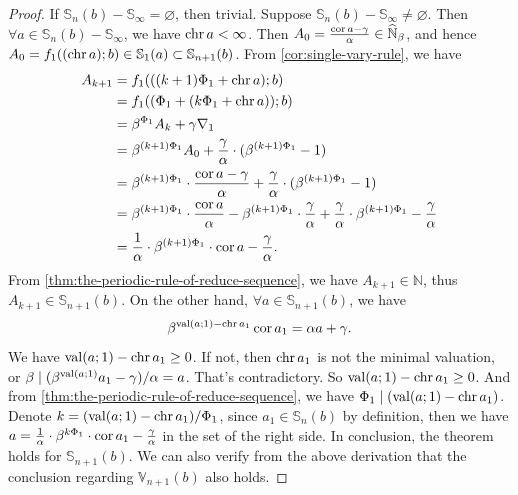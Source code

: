 \begin{proof}
    If $\mathbb{S}_{n}(b) - \mathbb{S}_{\infty} = \varnothing$, then trivial.\newline
    Suppose $\mathbb{S}_{n}(b) - \mathbb{S}_{\infty} \ne \varnothing$. Then $\forall a\in \mathbb{S}_{n}(b) - \mathbb{S}_{\infty}$, we have $\operatorname{chr} a < \infty$. Then $A_0 = \frac{\operatorname{cor} a - \gamma}{\alpha} \in\widehat{\mathbb{N}}_{\beta}$, and hence $A_0 = f_{1}((\operatorname{chr} a);b)\in \mathbb{S}_{1}(a)\subset \mathbb{S}_{n+1}(b)$. From \cref{cor:single-vary-rule}, we have
    \begin{align*}
        A_{k+1} &= f_{1}(((k+1)\Phi_1 + \operatorname{chr} a);b) \\
        &= f_{1}((\Phi_1 + (k\Phi_1 + \operatorname{chr} a));b) \\
        &= \beta^{\Phi_1} A_{k} + \gamma\nabla_1 \\
        &= \beta^{(k+1)\Phi_1} A_{0} + \frac{\gamma}{\alpha}\cdot(\beta^{(k+1)\Phi_1} - 1) \\
        &= \beta^{(k+1)\Phi_1}\cdot \frac{\operatorname{cor} a - \gamma}{\alpha} + \frac{\gamma}{\alpha}\cdot(\beta^{(k+1)\Phi_1} - 1) \\
        &= \beta^{(k+1)\Phi_1}\cdot \frac{\operatorname{cor} a}{\alpha} - \beta^{(k+1)\Phi_1}\cdot\frac{\gamma}{\alpha} + \frac{\gamma}{\alpha}\cdot\beta^{(k+1)\Phi_1} - \frac{\gamma}{\alpha} \\
        &= \frac{1}{\alpha}\cdot\beta^{(k+1)\Phi_1}\cdot\operatorname{cor} a - \frac{\gamma}{\alpha}.
    \end{align*}
    From \cref{thm:the-periodic-rule-of-reduce-sequence}, we have $A_{k+1}\in\mathbb{N}$, thus $A_{k+1}\in\mathbb{S}_{n+1}(b)$. \newline
    On the other hand, $\forall a\in\mathbb{S}_{n+1}(b)$, we have
    \[\beta^{\operatorname{val}(a;1) - \operatorname{chr} a_1}\operatorname{cor} a_1 = \alpha a + \gamma. \]
    We have $\operatorname{val}(a;1) - \operatorname{chr} a_1 \ge 0$. If not, then $\operatorname{chr} a_1$ is not the minimal valuation, or $\beta\mid(\beta^{\operatorname{val}(a;1)}a_1 - \gamma)/\alpha = a$. That's contradictory. So $\operatorname{val}(a;1) - \operatorname{chr} a_1 \ge 0$. And from \cref{thm:the-periodic-rule-of-reduce-sequence}, we have $\Phi_1\mid (\operatorname{val}(a;1) - \operatorname{chr} a_1)$. Denote $k = (\operatorname{val}(a;1) - \operatorname{chr} a_1)/\Phi_1$, since $a_1\in\mathbb{S}_{n}(b)$ by definition, then we have $a = \frac{1}{\alpha}\cdot\beta^{k\Phi_1}\cdot\operatorname{cor} a_1 - \frac{\gamma}{\alpha}$ in the set of the right side.\newline
    In conclusion, the theorem holds for $\mathbb{S}_{n + 1}(b)$. We can also verify from the above derivation that the conclusion regarding $\mathbb{V}_{n+1}(b)$ also holds.
\end{proof}
